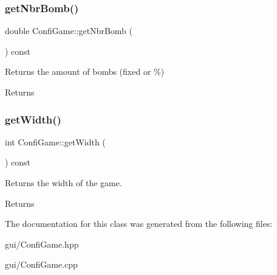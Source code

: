 \subsubsection{\texorpdfstring{get\+Nbr\+Bomb()}{getNbrBomb()}}
{\footnotesize\ttfamily double Confi\+Game\+::get\+Nbr\+Bomb (\begin{DoxyParamCaption}{ }\end{DoxyParamCaption}) const}



Returns the amount of bombs (fixed or \%) 

\begin{DoxyReturn}{Returns}

\end{DoxyReturn}
\mbox{\label{class_confi_game_ad54870fe45e47de1fb27305f4db48142}} 
\subsubsection{\texorpdfstring{get\+Width()}{getWidth()}}
{\footnotesize\ttfamily int Confi\+Game\+::get\+Width (\begin{DoxyParamCaption}{ }\end{DoxyParamCaption}) const}



Returns the width of the game. 

\begin{DoxyReturn}{Returns}

\end{DoxyReturn}


The documentation for this class was generated from the following files\+:\begin{DoxyCompactItemize}
\item 
gui/Confi\+Game.\+hpp\item 
gui/Confi\+Game.\+cpp\end{DoxyCompactItemize}
